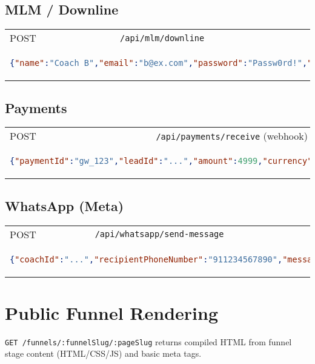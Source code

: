 \documentclass[11pt,a4paper]{article}
\begin{document}
\subsection{MLM / Downline}
\begin{longtable}{p{2.5cm}p{10cm}}
POST & \texttt{/api/mlm/downline} \\
\multicolumn{2}{p{13cm}}{\begin{lstlisting}[language=json]
{"name":"Coach B","email":"b@ex.com","password":"Passw0rd!","sponsorId":"..."}
\end{lstlisting}} \\
\end{longtable}

\subsection{Payments}
\begin{longtable}{p{2.5cm}p{10cm}}
POST & \texttt{/api/payments/receive} (webhook) \\
\multicolumn{2}{p{13cm}}{\begin{lstlisting}[language=json]
{"paymentId":"gw_123","leadId":"...","amount":4999,"currency":"INR","status":"successful","paymentMethod":"card","gatewayResponse":{"id":"gw_123","sig":"..."}}
\end{lstlisting}} \\
\end{longtable}

\subsection{WhatsApp (Meta)}
\begin{longtable}{p{2.5cm}p{10cm}}
POST & \texttt{/api/whatsapp/send-message} \\
\multicolumn{2}{p{13cm}}{\begin{lstlisting}[language=json]
{"coachId":"...","recipientPhoneNumber":"911234567890","messageContent":"Hello!"}
\end{lstlisting}} \\
\end{longtable}

\section{Public Funnel Rendering}
\texttt{GET /funnels/:funnelSlug/:pageSlug} returns compiled HTML from funnel stage content (HTML/CSS/JS) and basic meta tags.
\end{document}
